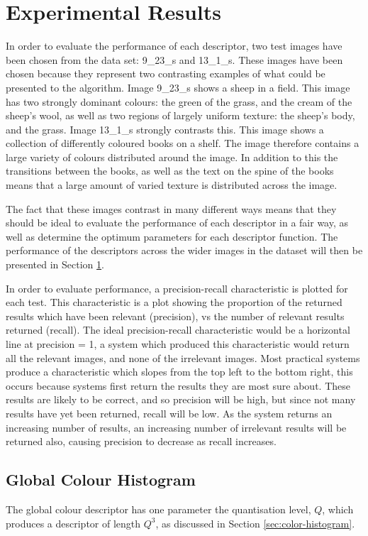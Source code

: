 \chapter{Experimental Results} \label{sec:results}

In order to evaluate the performance of each descriptor, two test images have been chosen from the data set: 9\_23\_s and 13\_1\_s. These images have been chosen because they represent two contrasting examples of what could be presented to the algorithm. Image 9\_23\_s shows a sheep in a field. This image has two strongly dominant colours: the green of the grass, and the cream of the sheep's wool, as well as two regions of largely uniform texture: the sheep's body, and the grass. Image 13\_1\_s strongly contrasts this. This image shows a collection of differently coloured books on a shelf. The image therefore contains a large variety of colours distributed around the image. In addition to this the transitions between the books, as well as the text on the spine of the books means that a large amount of varied texture is distributed across the image.

The fact that these images contrast in many different ways means that they should be ideal to evaluate the performance of each descriptor in a fair way, as well as determine the optimum parameters for each descriptor function. The performance of the descriptors across the wider images in the dataset will then be presented in Section \ref{sec:results}.

In order to evaluate performance, a precision-recall characteristic is plotted for each test. This characteristic is a plot showing the proportion of the returned results which have been relevant (precision), vs the number of relevant results returned (recall). The ideal precision-recall characteristic would be a horizontal line at precision = 1, a system which produced this characteristic would return all the relevant images, and none of the irrelevant images. Most practical systems produce a characteristic which slopes from the top left to the bottom right, this occurs because systems first return the results they are most sure about. These results are likely to be correct, and so precision will be high, but since not many results have yet been returned, recall will be low. As the system returns an increasing number of results, an increasing number of irrelevant results will be returned also, causing precision to decrease as recall increases.

\section{Global Colour Histogram} \label{sec:global-colour-histogram-results}
The global colour descriptor has one parameter the quantisation level, $Q$, which produces a descriptor of length $Q^3$, as discussed in Section \ref{sec:color-histogram}.

